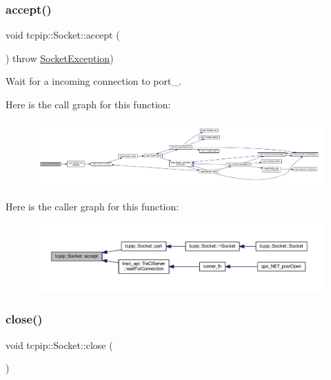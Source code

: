 \subsubsection{\texorpdfstring{accept()}{accept()}}
{\footnotesize\ttfamily void tcpip\+::\+Socket\+::accept (\begin{DoxyParamCaption}{ }\end{DoxyParamCaption}) throw  \hyperlink{classtcpip_1_1_socket_exception}{Socket\+Exception}) }



Wait for a incoming connection to port\+\_\+. 

Here is the call graph for this function\+:
\nopagebreak
\begin{figure}[H]
\begin{center}
\leavevmode
\includegraphics[width=350pt]{classtcpip_1_1_socket_a7847299f806a73798f4ceb95ab0e3d51_cgraph}
\end{center}
\end{figure}
Here is the caller graph for this function\+:
\nopagebreak
\begin{figure}[H]
\begin{center}
\leavevmode
\includegraphics[width=350pt]{classtcpip_1_1_socket_a7847299f806a73798f4ceb95ab0e3d51_icgraph}
\end{center}
\end{figure}
\mbox{\label{classtcpip_1_1_socket_adda6f45e2b5fabc7f539f4ddcbe4b144}} 
\subsubsection{\texorpdfstring{close()}{close()}}
{\footnotesize\ttfamily void tcpip\+::\+Socket\+::close (\begin{DoxyParamCaption}{ }\end{DoxyParamCaption})}

